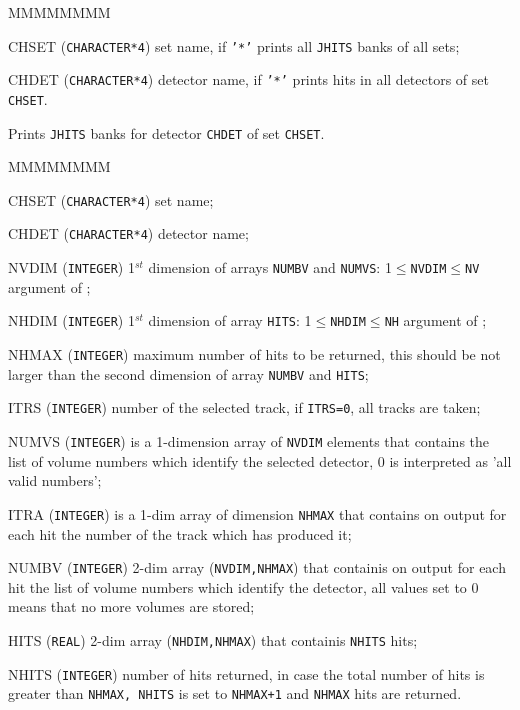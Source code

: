 \begin{DLtt}{MMMMMMMM}
\item[CHSET] ({\tt CHARACTER*4}) set name,
if {\tt '*'} prints all {\tt JHITS} banks of all sets;
\item[CHDET] ({\tt CHARACTER*4}) detector name,
if {\tt '*'} prints hits in all detectors of set {\tt
CHSET}.
\end{DLtt}
Prints {\tt JHITS} banks for detector {\tt CHDET} of set {\tt CHSET}.
 
 
\begin{DLtt}{MMMMMMMM}
\item[CHSET] ({\tt CHARACTER*4}) set name;
\item[CHDET] ({\tt CHARACTER*4}) detector name;
\item[NVDIM] ({\tt INTEGER}) 1$^{st}$ dimension of arrays {\tt NUMBV} and
{\tt NUMVS}: 1$\leq${\tt NVDIM}$\leq${\tt NV} argument of ;
\item[NHDIM] ({\tt INTEGER}) 1$^{st}$ dimension of array {\tt HITS}:
1$\leq${\tt NHDIM}$\leq${\tt NH} argument of ;
\item[NHMAX] ({\tt INTEGER}) maximum number of hits to be returned, this 
should be not larger than the second dimension of array {\tt NUMBV} and
{\tt HITS};
\item[ITRS] ({\tt INTEGER}) number of the selected track,
if {\tt ITRS=0}, all tracks are taken;
\item[NUMVS] ({\tt INTEGER}) is a 1-dimension array of {\tt NVDIM}
elements that contains
the list of volume numbers which identify the selected detector,
0 is interpreted as 'all valid numbers';
\item[ITRA] ({\tt INTEGER}) is a 1-dim array of dimension {\tt NHMAX}
that contains on output
for each hit the number of the track which has produced it;
\item[NUMBV] ({\tt INTEGER}) 2-dim array ({\tt NVDIM,NHMAX})
that containis on output for each hit the
list of volume numbers which identify the detector, all values set to 
0 means that no more volumes are stored;
\item[HITS] ({\tt REAL}) 2-dim array ({\tt NHDIM,NHMAX}) that containis 
{\tt NHITS} hits;
\item[NHITS] ({\tt INTEGER}) number of hits returned, in case the total
number of hits is greater than {\tt NHMAX, NHITS} is set to
{\tt NHMAX+1} and {\tt NHMAX} hits are returned.
\end{DLtt}

